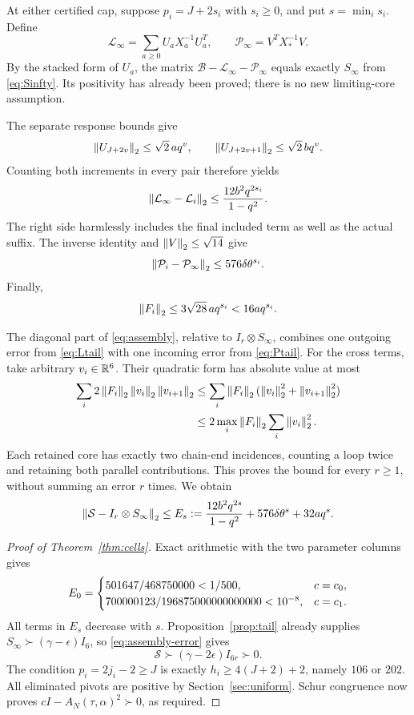 At either certified cap, suppose $p_i=J+2s_i$ with $s_i\ge0$, and put
$s=\min_i s_i$. Define
\[
 \mathcal L_\infty=\sum_{a\ge0}U_aX_a^{-1}U_a^T,
 \qquad \mathcal P_\infty=V^TX_*^{-1}V.
\]
By the stacked form of $U_a$, the matrix
$\mathcal B-\mathcal L_\infty-\mathcal P_\infty$ equals exactly
$S_\infty$ from \eqref{eq:Sinfty}. Its positivity has already been
proved; there is no new limiting-core assumption.

The separate response bounds give
\[
 \left\lVert U_{J+2v}\right\rVert_2\le\sqrt2\,a q^v,
 \qquad \left\lVert U_{J+2v+1}\right\rVert_2\le\sqrt2\,b q^v.
\]
Counting both increments in every pair therefore yields
\begin{equation}
 \left\lVert\mathcal L_\infty-\mathcal L_i\right\rVert_2
 \le\frac{12b^2q^{2s_i}}{1-q^2}.
 \label{eq:Ltail}
\end{equation}
The right side harmlessly includes the final included term as well as
the actual suffix. The inverse identity and $\left\lVert V\right\rVert_2\le\sqrt{14}$
give
\begin{equation}
 \left\lVert\mathcal P_i-\mathcal P_\infty\right\rVert_2
 \le576\delta\theta^{s_i}.
 \label{eq:Ptail}
\end{equation}
Finally,
\begin{equation}
 \left\lVert F_i\right\rVert_2\le3\sqrt{28}\,a q^{s_i}<16a q^{s_i}.
 \label{eq:Ftail}
\end{equation}

The diagonal part of \eqref{eq:assembly}, relative to
$I_r\otimes S_\infty$, combines one outgoing error from
\eqref{eq:Ltail} with one incoming error from \eqref{eq:Ptail}.
For the cross terms, take arbitrary $v_i\in\mathbb R^6$. Their quadratic form
has absolute value at most
\begin{align*}
 \sum_i2\left\lVert F_i\right\rVert_2\left\lVert v_i\right\rVert_2\left\lVert v_{i+1}\right\rVert_2
 &\le\sum_i\left\lVert F_i\right\rVert_2(\left\lVert v_i\right\rVert_2^2+\left\lVert v_{i+1}\right\rVert_2^2)\\
 &\le2\max_i\left\lVert F_i\right\rVert_2\sum_i\left\lVert v_i\right\rVert_2^2.
\end{align*}
Each retained core has exactly two chain-end incidences, counting a loop
twice and retaining both parallel contributions. This proves the bound
for every $r\ge1$, without summing an error $r$ times. We obtain
\begin{equation}
 \left\lVert\mathcal S-I_r\otimes S_\infty\right\rVert_2
 \le E_s:=\frac{12b^2q^{2s}}{1-q^2}
              +576\delta\theta^s+32a q^s.
 \label{eq:assembly-error}
\end{equation}

\begin{proof}[Proof of Theorem~\ref{thm:cells}]
Exact arithmetic with the two parameter columns gives
\[
 E_0=
 \begin{cases}
 501647/468750000<1/500,&c=c_0,\\
 700000123/196875000000000000<10^{-8},&c=c_1.
 \end{cases}
\]
All terms in $E_s$ decrease with $s$. Proposition~\ref{prop:tail} already
supplies $S_\infty\succ(\gamma-\epsilon)I_6$, so
\eqref{eq:assembly-error} gives
\[
 \mathcal S\succ(\gamma-2\epsilon)I_{6r}\succ0.
\]
The condition $p_i=2j_i-2\ge J$ is exactly
$h_i\ge4(J+2)+2$, namely $106$ or $202$. All eliminated pivots are
positive by Section~\ref{sec:uniform}. Schur congruence now proves
$cI-A_N(\tau,\alpha)^2\succ0$, as required.
\end{proof}

